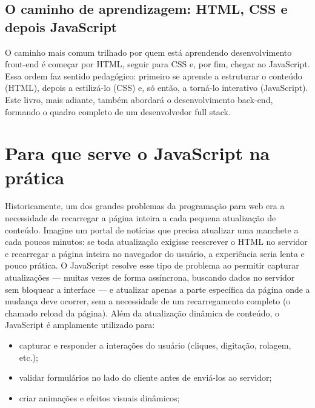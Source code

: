 \subsection{O caminho de aprendizagem: HTML, CSS e depois JavaScript}

O caminho mais comum trilhado por quem está aprendendo desenvolvimento front-end é começar por HTML, seguir para CSS e, por fim, chegar ao JavaScript. Essa ordem faz sentido pedagógico: primeiro se aprende a estruturar o conteúdo (HTML), depois a estilizá-lo (CSS) e, só então, a torná-lo interativo (JavaScript). Este livro, mais adiante, também abordará o desenvolvimento back-end, formando o quadro completo de um desenvolvedor full stack.

\section{Para que serve o JavaScript na prática}

Historicamente, um dos grandes problemas da programação para web era a necessidade de recarregar a página inteira a cada pequena atualização de conteúdo. Imagine um portal de notícias que precisa atualizar uma manchete a cada poucos minutos: se toda atualização exigisse reescrever o HTML no servidor e recarregar a página inteira no navegador do usuário, a experiência seria lenta e pouco prática. O JavaScript resolve esse tipo de problema ao permitir capturar atualizações — muitas vezes de forma assíncrona, buscando dados no servidor sem bloquear a interface — e atualizar apenas a parte específica da página onde a mudança deve ocorrer, sem a necessidade de um recarregamento completo (o chamado reload da página). Além da atualização dinâmica de conteúdo, o JavaScript é amplamente utilizado para:

\begin{itemize}
  \item capturar e responder a interações do usuário (cliques, digitação, rolagem, etc.);
\end{itemize}

\begin{itemize}
  \item validar formulários no lado do cliente antes de enviá-los ao servidor;
\end{itemize}

\begin{itemize}
  \item criar animações e efeitos visuais dinâmicos;
\end{itemize}

